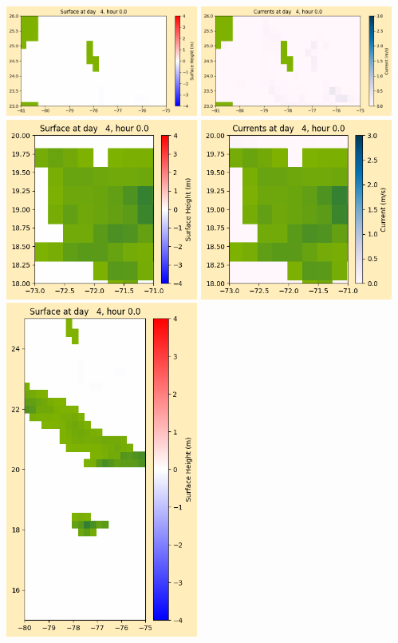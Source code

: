 \documentclass[11pt]{article}
\begin{document}
\vskip 10pt 
\includegraphics[width=0.475\textwidth]{frame0028fig1003.png}
\includegraphics[width=0.475\textwidth]{frame0028fig1004.png}
\vskip 10pt 
\includegraphics[width=0.475\textwidth]{frame0028fig1005.png}
\includegraphics[width=0.475\textwidth]{frame0028fig1006.png}
\vskip 10pt 
\includegraphics[width=0.475\textwidth]{frame0028fig1007.png}
\end{document}
